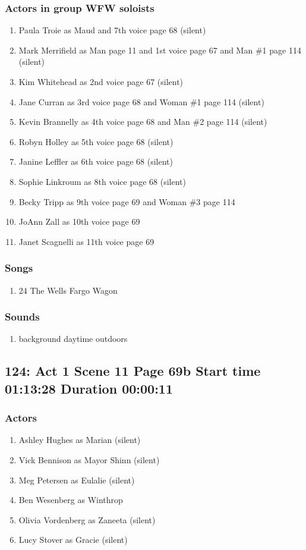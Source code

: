\subsubsection{Actors in group WFW soloists}
\begin{enumerate}
\item Paula Troie as Maud and 7th voice page 68 (silent)
\item Mark Merrifield as Man page 11 and 1st voice page 67 and Man \#1 page 114 (silent)
\item Kim Whitehead as 2nd voice page 67 (silent)
\item Jane Curran as 3rd voice page 68 and Woman \#1 page 114 (silent)
\item Kevin Brannelly as 4th voice page 68 and Man \#2 page 114 (silent)
\item Robyn Holley as 5th voice page 68 (silent)
\item Janine Leffler as 6th voice page 68 (silent)
\item Sophie Linkroum as 8th voice page 68 (silent)
\item Becky Tripp as 9th voice page 69 and Woman \#3 page 114
\item JoAnn Zall as 10th voice page 69
\item Janet Scagnelli as 11th voice page 69
\end{enumerate}

\subsubsection{Songs}
\begin{enumerate}
\item 24 The Wells Fargo Wagon
\end{enumerate}\subsubsection{Sounds}
\begin{enumerate}
\item background daytime outdoors
\end{enumerate}
\subsection{124: Act 1 Scene 11 Page 69b Start time 01:13:28 Duration 00:00:11}

\subsubsection{Actors}
\begin{enumerate}
\item Ashley Hughes as Marian (silent)
\item Vick Bennison as Mayor Shinn (silent)
\item Meg Petersen as Eulalie (silent)
\item Ben Wesenberg as Winthrop
\item Olivia Vordenberg as Zaneeta (silent)
\item Lucy Stover as Gracie (silent)
\end{enumerate}
